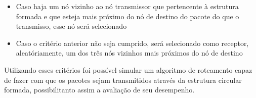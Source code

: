 \begin{itemize}
\item Caso haja um nó vizinho ao nó transmissor que pertencente à estrutura formada e que esteja mais próximo do nó de destino do pacote do que o transmisso, esse nó será selecionado
\item Caso o critério anterior não seja cumprido, será selecionado como receptor, aleatóriamente, um dos três nós vizinhos mais próximos do nó de destino
\end{itemize}

Utilizando esses critérios foi possível simular um algoritmo de roteamento capaz de fazer com que os pacotes sejam transmitidos através da estrutura circular formada, possibilitanto assim a avaliação de seu desempenho.



